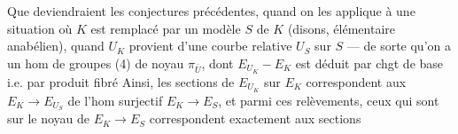 Que deviendraient les conjectures précédentes, quand on les applique à une situation où $K$ est remplacé par un modèle $S$ de $K$ (disons, élémentaire anabélien), quand $U_K$ provient d'une courbe relative $U_S$ sur $S$ — de sorte qu'on a un hom de groupes
(4)\quad{}
de noyau $\pi_{\bar U}$, dont $E_{U_K}-E_K$ est déduit par chgt de base i.e. par produit fibré
\quad{}
Ainsi, les sections de $E_{U_K}$ sur $E_K$ correspondent aux   $E_K\longrightarrow E_{U_S}$ de l'hom surjectif $E_K\longrightarrow E_S$, et parmi ces relèvements, ceux qui sont  sur le noyau de $E_K\longrightarrow E_S$ correspondent exactement aux sections
